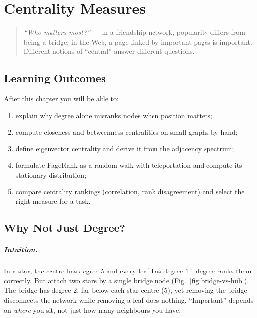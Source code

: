\chapter{Centrality Measures}
\label{ch:centrality}
\sloppy

\begin{quote}
\emph{``Who matters most?''} --- In a friendship network, popularity differs from being a bridge; in the Web, a page linked by important pages is important. Different notions of ``central'' answer different questions.
\end{quote}

\noindent{}
\vspace{0.4em}

\section*{Learning Outcomes}
After this chapter you will be able to:
\begin{enumerate}[label=(L\arabic*)]
    \item explain why degree alone misranks nodes when position matters;
    \item compute closeness and betweenness centralities on small graphs by hand;
    \item define eigenvector centrality and derive it from the adjacency spectrum;
    \item formulate PageRank as a random walk with teleportation and compute its stationary distribution;
    \item compare centrality rankings (correlation, rank disagreement) and select the right measure for a task.
\end{enumerate}

\section{Why Not Just Degree?}
\label{sec:why-not-degree}
\paragraph{Intuition.} In a star, the centre has degree $5$ and every leaf has degree $1$---degree ranks them correctly. But attach two stars by a single bridge node (Fig.~\ref{fig:bridge-vs-hub}). The bridge has degree $2$, far below each star centre ($5$), yet removing the bridge disconnects the network while removing a leaf does nothing. ``Important'' depends on \emph{where} you sit, not just how many neighbours you have.

